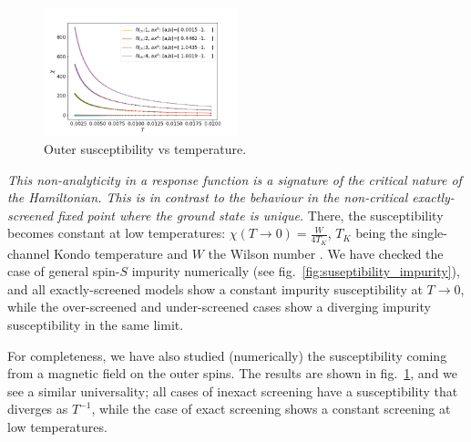 \documentclass[reprint,prb,superscriptaddress]{revtex4-2}
\begin{document}
\begin{figure}
\centering
\includegraphics[width=0.5\textwidth]{plt/Outer_Field_Chi_Powerlaw_}
\caption{Outer susceptibility vs temperature.}
\label{fig:suseptibility_outer}
\end{figure}

\textit{This non-analyticity in a response function is a signature of the critical nature of the Hamiltonian. This is in contrast to the behaviour in the non-critical exactly-screened fixed point where the ground state is unique.} There, the susceptibility becomes constant at low temperatures: \(\chi(T\to 0) = \frac{W}{4 T_K}\), \(T_K\) being the single-channel Kondo temperature and \(W\) the Wilson number \cite{wilson1975renormalization,nozieres1974fermi,bullaNRGreview,kondo_urg}. We have checked the case of general spin-\(S\) impurity numerically (see fig.~\ref{fig:suseptibility_impurity}), and all exactly-screened models show a constant impurity susceptibility at \(T \to 0\), while the over-screened and under-screened cases show a diverging impurity susceptibility in the same limit. 

For completeness, we have also studied (numerically) the susceptibility coming from a magnetic field on the outer spins. The results are shown in fig.~\ref{fig:suseptibility_outer}, and we see a similar universality; all cases of inexact screening have a susceptibility that diverges as \(T^{-1}\), while the case of exact screening shows a constant screening at low temperatures.
\end{document}
